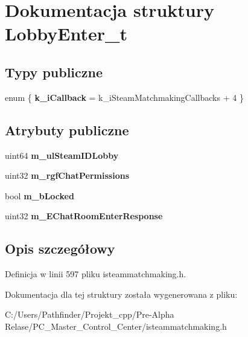 \hypertarget{struct_lobby_enter__t}{}\section{Dokumentacja struktury Lobby\+Enter\+\_\+t}
\label{struct_lobby_enter__t}
\subsection*{Typy publiczne}
\begin{DoxyCompactItemize}
\item 
\mbox{\label{struct_lobby_enter__t_a90b0ae2fcc03948881caa75617190793}} 
enum \{ {\bfseries k\+\_\+i\+Callback} = k\+\_\+i\+Steam\+Matchmaking\+Callbacks + 4
 \}
\end{DoxyCompactItemize}
\subsection*{Atrybuty publiczne}
\begin{DoxyCompactItemize}
\item 
\mbox{\label{struct_lobby_enter__t_a8822d84d62dea65b70ced5660a8a54ab}} 
uint64 {\bfseries m\+\_\+ul\+Steam\+I\+D\+Lobby}
\item 
\mbox{\label{struct_lobby_enter__t_a3506bc2f8fc4f649e2849cc11e162b2b}} 
uint32 {\bfseries m\+\_\+rgf\+Chat\+Permissions}
\item 
\mbox{\label{struct_lobby_enter__t_acf80dcf9eee12788782f255a2254987a}} 
bool {\bfseries m\+\_\+b\+Locked}
\item 
\mbox{\label{struct_lobby_enter__t_a2cf1d21f2dc845f7eb0d167b60fa773b}} 
uint32 {\bfseries m\+\_\+\+E\+Chat\+Room\+Enter\+Response}
\end{DoxyCompactItemize}


\subsection{Opis szczegółowy}


Definicja w linii 597 pliku isteammatchmaking.\+h.



Dokumentacja dla tej struktury została wygenerowana z pliku\+:\begin{DoxyCompactItemize}
\item 
C\+:/\+Users/\+Pathfinder/\+Projekt\+\_\+cpp/\+Pre-\/\+Alpha Relase/\+P\+C\+\_\+\+Master\+\_\+\+Control\+\_\+\+Center/isteammatchmaking.\+h\end{DoxyCompactItemize}
